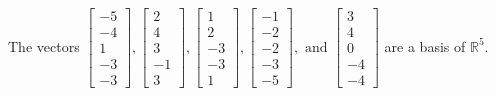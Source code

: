 \begin{exercise}
\begin{exerciseStatement}
  \end{exerciseStatement}
  \begin{exerciseAnswer}
   The vectors \(\left[\begin{array}{r}
-5 \\
-4 \\
1 \\
-3 \\
-3
\end{array}\right] , \left[\begin{array}{r}
2 \\
4 \\
3 \\
-1 \\
3
\end{array}\right] , \left[\begin{array}{r}
1 \\
2 \\
-3 \\
-3 \\
1
\end{array}\right] , \left[\begin{array}{r}
-1 \\
-2 \\
-2 \\
-3 \\
-5
\end{array}\right] , \text{ and } \left[\begin{array}{r}
3 \\
4 \\
0 \\
-4 \\
-4
\end{array}\right]\) 
  	 are  a basis of \(\mathbb{R}^5\).
  


  \end{exerciseAnswer}
\end{exercise}